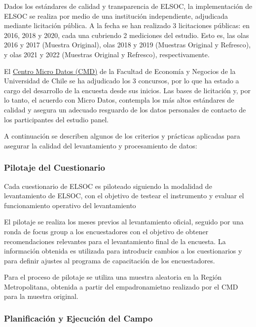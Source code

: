 \documentclass[
  12pt,
]{article}
\begin{document}
Dados los estándares de calidad y transparencia de ELSOC, la implementación de ELSOC se realiza por medio de una institución independiente, adjudicada mediante licitación pública. A la fecha se han realizado 3 licitaciones públicas: en 2016, 2018 y 2020, cada una cubriendo 2 mediciones del estudio. Esto es, las olas 2016 y 2017 (Muestra Original), olas 2018 y 2019 (Muestras Original y Refresco), y olas 2021 y 2022 (Muestras Original y Refresco), respectivamente.

El \href{https://www.microdatos.cl}{Centro Micro Datos (CMD)} de la Facultad de Economía y Negocios de la Universidad de Chile se ha adjudicado los 3 concursos, por lo que ha estado a cargo del desarrollo de la encuesta desde sus inicios. Las bases de licitación y, por lo tanto, el acuerdo con Micro Datos, contempla los más altos estándares de calidad y asegura un adecuado resguardo de los datos personales de contacto de los participantes del estudio panel.

A continuación se describen algunos de los criterios y prácticas aplicadas para asegurar la calidad del levantamiento y procesamiento de datos:

\hypertarget{pilotaje-del-cuestionario}{%
\subsubsection*{Pilotaje del Cuestionario}\label{pilotaje-del-cuestionario}}

Cada cuestionario de ELSOC es piloteado siguiendo la modalidad de levantamiento de ELSOC, con el objetivo de testear el instrumento y evaluar el funcionamiento operativo del levantamiento

El pilotaje se realiza los meses previos al levantamiento oficial, seguido por una ronda de focus group a los encuestadores con el objetivo de obtener recomendaciones relevantes para el levantamiento final de la encuesta. La información obtenida es utilizada para introducir cambios a los cuestionarios y para definir ajustes al programa de capacitación de los encuestadores.

Para el proceso de pilotaje se utiliza una muestra aleatoria en la Región Metropolitana, obtenida a partir del empadronamietno realizado por el CMD para la muestra original.

\hypertarget{planificaciuxf3n-y-ejecuciuxf3n-del-campo}{%
\subsubsection*{Planificación y Ejecución del Campo}\label{planificaciuxf3n-y-ejecuciuxf3n-del-campo}}
\end{document}
